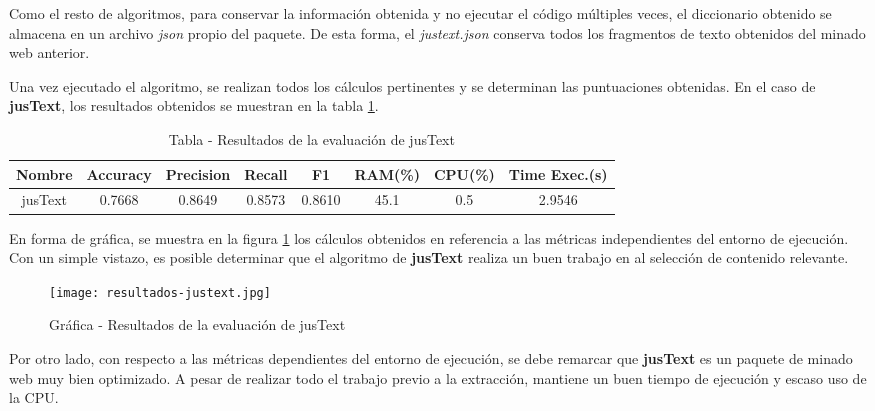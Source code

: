 Como el resto de algoritmos, para conservar la información obtenida y no ejecutar el código múltiples 
veces, el diccionario obtenido se almacena en un archivo \emph{json} propio del paquete. De esta forma, 
el \emph{justext.json} conserva todos los fragmentos de texto obtenidos del minado web anterior.

Una vez ejecutado el algoritmo, se realizan todos los cálculos pertinentes y se determinan las puntuaciones 
obtenidas. En el caso de \textbf{jusText}, los resultados obtenidos se muestran en la tabla 
\ref{tab:tabla - resultados de la evaluacion de justext}.

\begin{table}[h]
    \begin{center}
      \begin{tabular}{| c | c | c | c | c | c | c | c |} \hline 
       \textbf{Nombre} & \textbf{Accuracy} & \textbf{Precision}  & \textbf{Recall} & \textbf{F1} & \textbf{RAM(\%)} & \textbf{CPU(\%)} & \textbf{Time Exec.(s)} \\ \hline
       jusText & 0.7668 & 0.8649 & 0.8573 & 0.8610 & 45.1 & 0.5 & 2.9546 \\ \hline
      \end{tabular}
      \caption{Tabla - Resultados de la evaluación de jusText}
      \label{tab:tabla - resultados de la evaluacion de justext}
    \end{center}
\end{table}

En forma de gráfica, se muestra en la figura \ref{img:grafica - resultados de la evaluacion de justext}
los cálculos obtenidos en referencia a las métricas independientes del entorno de ejecución. Con un simple
vistazo, es posible determinar que el algoritmo de \textbf{jusText} realiza un buen trabajo en al selección
de contenido relevante. 

\begin{figure}[tphb]
    \centering
    \texttt{[image: resultados-justext.jpg]}
    \caption{Gráfica - Resultados de la evaluación de jusText}
    \label{img:grafica - resultados de la evaluacion de justext}
\end{figure}

Por otro lado, con respecto a las métricas dependientes del entorno de ejecución, se debe remarcar que
\textbf{jusText} es un paquete de minado web muy bien optimizado. A pesar de realizar todo el trabajo previo
a la extracción, mantiene un buen tiempo de ejecución y escaso uso de la CPU.

